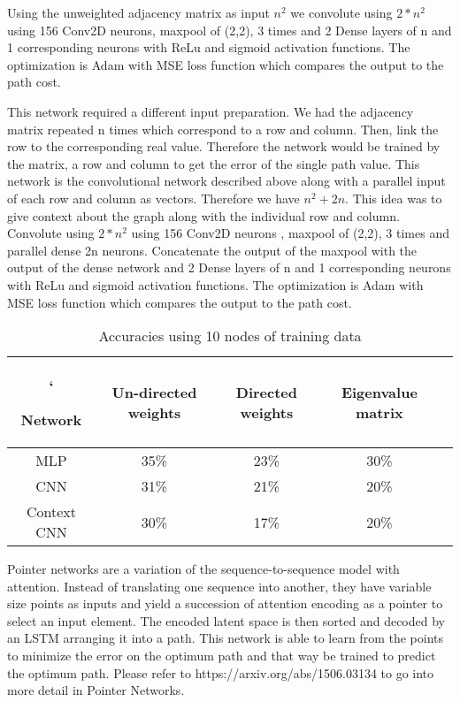 \documentclass{iitthesis}
\begin{document}
Using the unweighted adjacency matrix as input $n^2$ we convolute using $2*n^2$ using 156 Conv2D neurons, maxpool of (2,2), 3 times and 2 Dense layers of n and 1 corresponding neurons with ReLu and sigmoid activation functions. The optimization is Adam with MSE loss function which compares the output to the path cost. 

This network required a different input preparation. We had the adjacency matrix repeated n times which correspond to a row and column. Then, link the row to the corresponding real value. Therefore the network would be trained by the matrix, a row and column to get the error of the single path value. 
This network is the convolutional network described above along with a parallel input of each row and column as vectors. Therefore we have $n^2 + 2n$. This idea was to give context about the graph along with the individual row and column. Convolute using $2*n^2$ using 156 Conv2D neurons , maxpool of (2,2), 3 times and parallel dense 2n neurons. Concatenate the output of the maxpool with the output of the dense network and 2 Dense layers of n and 1 corresponding neurons with ReLu and sigmoid activation functions. The optimization is Adam with MSE loss function which compares the output to the path cost.


\begin{table}[ht]
\caption{Accuracies using 10 nodes of training data }   %
\centering                          %
\begin{tabular}{c c c c c }            %
\hline\hline     `                   %

Network & Un-directed weights &  Directed weights  & Eigenvalue matrix \\ [0.3ex] %
\hline                              %
MLP&35\%&23\%&30\%\\
CNN&31\%&21\%&20\%\\
Context CNN&30\%&17\%&20\%\\ [1ex]         %
\hline                              %
\end{tabular}
\label{table:nonlin}                %
\end{table}

Pointer networks\cite{vinyals2015pointer} are a variation of the sequence-to-sequence model with attention. Instead of translating one sequence into another, they have variable size points as inputs and yield a succession of attention encoding as a pointer to select an input element. The encoded latent space is then sorted and decoded by an LSTM arranging it into a path.  This network is able to learn from the points to minimize the error on the optimum path and that way be trained to predict the optimum path. Please refer to https://arxiv.org/abs/1506.03134 to go into more detail in Pointer Networks.
\end{document}
